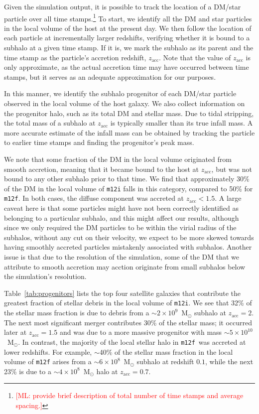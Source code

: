 \documentclass[twocolumn,preprintnumbers]{aastex6}
\newcommand{\zacc}{z_\mathrm{acc}}
\def\ML#1{\textcolor{red}{[ML: #1]}}
\newcommand{\mf}{\texttt{m12f}}
\begin{document}
Given the simulation output, it is possible to track the location of a DM/star particle over all time stamps.\footnote{\ML{provide brief description of total number of time stamps and average spacing.}} To start, we identify all the DM and star particles in the local volume of the host at the present day.  We then follow the location of each particle at incrementally larger redshifts, verifying whether it is bound to a subhalo at a given time stamp.  If it is, we mark the subhalo as its parent and the time stamp as the particle's accretion redshift, $\zacc$.  Note that the value of $\zacc$ is only approximate, as the actual accretion time may have occurred between time stamps, but it serves as an adequate approximation for our purposes. 

In this manner, we identify the subhalo progenitor of each DM/star particle observed in the local volume of the host galaxy.  We also  collect information on the progenitor halo, such as its total DM and stellar mass. Due to tidal stripping, the total mass of a subhalo at $\zacc$ is typically smaller than its true infall mass.  A more accurate estimate of the infall mass can be obtained by tracking the particle to earlier time stamps and finding the progenitor's peak mass.

We note that some fraction of the DM in the local volume originated from smooth accretion, meaning that it became bound to the host at $\zacc$, but was not bound to any other subhalo prior to that time.  We find that approximately 30\% of the DM in the local volume of \texttt{m12i} falls in this category, compared to 50\% for \texttt{m12f}.  In both cases, the diffuse component was accreted at $\zacc <1.5$.  A large caveat here is that some particles might have not been correctly identified as belonging to a particular subhalo, and this might affect our results, although since we only required the DM particles to be within the virial radius of the subhalos, without any cut on their velocity, we expect to be more skewed towards having smoothly accreted particles mistakenly associated with subhalos. Another issue is that due to the resolution of the simulation, some of the DM that we attribute to smooth accretion may acction originate from small subhalos below the simulation's resolution.

Table~\ref{tab:progenitors} lists the top four satellite galaxies  that contribute the greatest fraction of stellar debris in the local volume of \texttt{m12i}.  We see that 32\% of the stellar mass fraction is due to debris from a $\sim 2 \times 10^9$~M$_\odot$ subhalo at $z_\text{acc} = 2$.  The next most significant merger contributes 30\% of the stellar mass; it occurred later at $\zacc = 1.5$ and was due to a more massive progenitor with mass $\sim 5\times 10^{10}$~M$_\odot$.  In contrast, the majority of the local stellar halo in \mf~was accreted at lower redshifts.  
For example, $\sim$40\% of the stellar mass fraction in the local volume of \texttt{m12f} arises from a $\sim 6\times 10^8$~M$_\odot$ subhalo at redshift $0.1$, while the next 23\% is due to a $\sim4\times10^8$~M$_\odot$ halo at $\zacc = 0.7$.  
\end{document}
